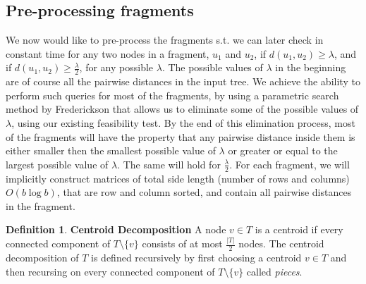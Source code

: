 \documentclass[11pt,a4paper]{article}
\theoremstyle{definition}
\newtheorem{definition}{Definition}
\theoremstyle{remark}
\begin{document}
\subsection{Pre-processing fragments} \label{Pre-Processing Fragments}
We now would like to pre-process the fragments s.t. we can later check in constant time for any two nodes in a fragment, $u_1$ and $u_2$, if $d(u_1,u_2)\geq\lambda$, and if $d(u_1,u_2) \geq \frac{\lambda}{2}$, for any possible $\lambda$. The possible values of $\lambda$ in the beginning are of course all the pairwise distances in the input tree. We achieve the ability to perform such queries for most of the fragments, by using a parametric search method by Frederickson that allows us to eliminate some of the possible values of $\lambda$, using our existing feasibility test. By the end of this elimination process, most of the fragments will have the property that any pairwise distance inside them is either smaller then the smallest possible value of $\lambda$ or
 greater or equal to the largest possible value of $\lambda$. The same will hold for $\frac{\lambda}{2}$.
For each fragment, we will implicitly construct matrices of total side length (number of rows and columns) $O(b \log b)$, that are row and column sorted, and contain all pairwise distances in the fragment.

\begin{definition} \textbf{Centroid Decomposition}
A node $v\in T$ is a centroid if every connected component of $T\setminus\{v\}$ consists of at most $\frac{|T|}{2}$
nodes. The centroid decomposition of $T$ is defined recursively by first choosing a centroid $v\in T$
and then recursing on every connected component of $T\setminus\{v\}$ called \emph{pieces}.
\end{definition}
\end{document}
